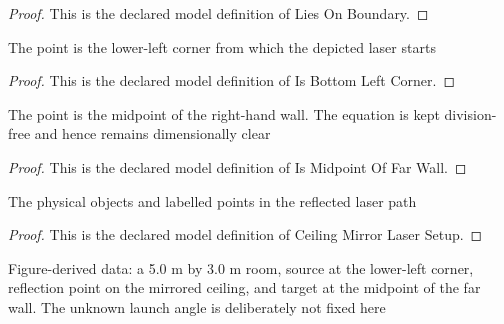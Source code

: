 \begin{proof}
  This is the declared model definition of Lies On Boundary.
\end{proof}
\begin{definition}
  \label{def:physics:phyx-mini-0063:phyxminiproblems-problemphyxmini0063-isbottomleftcorner}
  The point is the lower-left corner from which the depicted laser starts
\end{definition}
\begin{proof}
  This is the declared model definition of Is Bottom Left Corner.
\end{proof}
\begin{definition}
  \label{def:physics:phyx-mini-0063:phyxminiproblems-problemphyxmini0063-ismidpointoffarwall}
  The point is the midpoint of the right-hand wall. The equation is kept division-free and hence remains dimensionally clear
\end{definition}
\begin{proof}
  This is the declared model definition of Is Midpoint Of Far Wall.
\end{proof}
\begin{definition}
  \label{def:physics:phyx-mini-0063:phyxminiproblems-problemphyxmini0063-ceilingmirrorlasersetup}
  The physical objects and labelled points in the reflected laser path
\end{definition}
\begin{proof}
  This is the declared model definition of Ceiling Mirror Laser Setup.
\end{proof}
\begin{definition}
  \label{def:physics:phyx-mini-0063:phyxminiproblems-problemphyxmini0063-matchesfigurereadouts}
  Figure-derived data: a 5.0 m by 3.0 m room, source at the lower-left corner, reflection point on the mirrored ceiling, and target at the midpoint of the far wall. The unknown launch angle is deliberately not fixed here
\end{definition}
